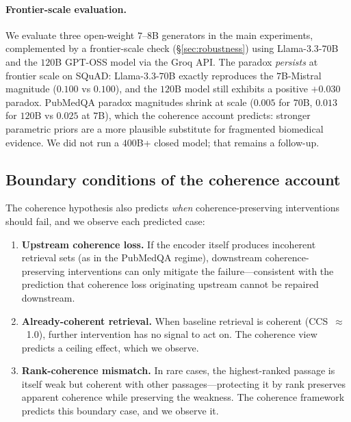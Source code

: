 \paragraph{Frontier-scale evaluation.}
\label{sec:limitations:frontier}
We evaluate three open-weight $7$--$8$B generators in the main
experiments, complemented by a frontier-scale check
(\S\ref{sec:robustness}) using Llama-$3.3$-$70$B and the $120$B
GPT-OSS model via the Groq API. The paradox \emph{persists} at frontier
scale on SQuAD: Llama-$3.3$-$70$B exactly reproduces the $7$B-Mistral
magnitude ($0.100$ vs $0.100$), and the $120$B model still exhibits a
positive $+0.030$ paradox. PubMedQA paradox magnitudes shrink at scale
($0.005$ for $70$B, $0.013$ for $120$B vs $0.025$ at $7$B), which the
coherence account predicts: stronger parametric priors are a more
plausible substitute for fragmented biomedical evidence. We did not
run a $400$B+ closed model; that remains a follow-up.

\subsection{Boundary conditions of the coherence account}

The coherence hypothesis also predicts \emph{when} coherence-preserving
interventions should fail, and we observe each predicted case:

\begin{enumerate}
  \item \textbf{Upstream coherence loss.} If the encoder itself produces
        incoherent retrieval sets (as in the PubMedQA regime),
        downstream coherence-preserving interventions can only mitigate
        the failure---consistent with the prediction that coherence loss
        originating upstream cannot be repaired downstream.

  \item \textbf{Already-coherent retrieval.} When baseline retrieval is
        coherent (CCS~$\approx$~1.0), further intervention has no signal
        to act on. The coherence view predicts a ceiling effect, which
        we observe.

  \item \textbf{Rank-coherence mismatch.} In rare cases, the
        highest-ranked passage is itself weak but coherent with other
        passages---protecting it by rank preserves apparent coherence
        while preserving the weakness. The coherence framework predicts
        this boundary case, and we observe it.
\end{enumerate}

